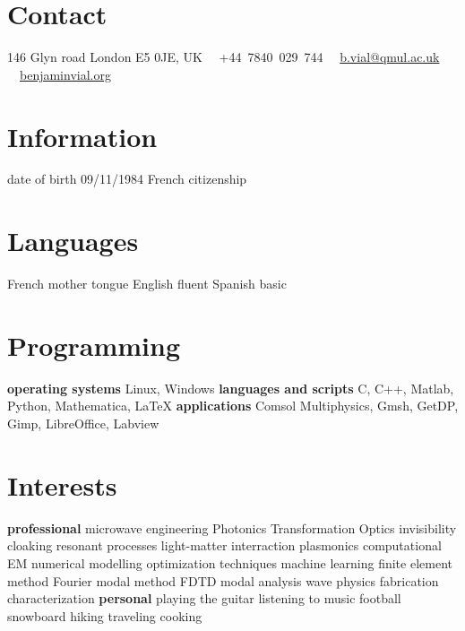 \documentclass[]{cv} %
\begin{document}


\begin{aside} %
\section{Contact}
146 Glyn road
London E5 0JE, UK
\faPhone~~+44~7840~029~744
\faEnvelope~~\href{mailto:b.vial@qmul.ac.uk}{b.vial@qmul.ac.uk}
\faUser~~\href{www.benjaminvial.org}{benjaminvial.org}
\section{Information}
date of birth 09/11/1984
French citizenship
\section{Languages}
French mother tongue
English fluent
Spanish basic
\section{Programming}
\textbf{operating systems}
Linux, Windows
\textbf{languages and scripts}
C, C++, Matlab, Python, Mathematica, \LaTeX
\textbf{applications}
Comsol Multiphysics, Gmsh, GetDP, Gimp, LibreOffice, Labview
\section{Interests}
\textbf{professional}
microwave engineering
Photonics
Transformation Optics
invisibility cloaking
resonant processes
light-matter interraction
plasmonics
computational EM
numerical modelling
optimization techniques
machine learning
finite element method
Fourier modal method
FDTD
modal analysis
wave physics
fabrication
characterization
\textbf{personal}
playing the guitar
listening to music
football
snowboard
hiking
traveling
cooking
\end{aside}


\end{document}
